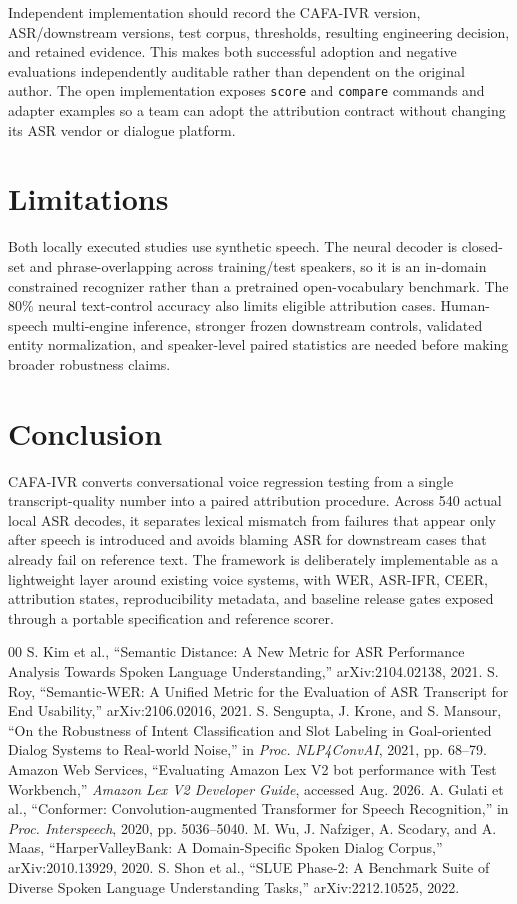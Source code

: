 \documentclass[conference]{IEEEtran}
\begin{document}
Independent implementation should record the CAFA-IVR version, ASR/downstream versions, test corpus, thresholds, resulting engineering decision, and retained evidence. This makes both successful adoption and negative evaluations independently auditable rather than dependent on the original author. The open implementation exposes \texttt{score} and \texttt{compare} commands and adapter examples so a team can adopt the attribution contract without changing its ASR vendor or dialogue platform.

\section{Limitations}
Both locally executed studies use synthetic speech. The neural decoder is closed-set and phrase-overlapping across training/test speakers, so it is an in-domain constrained recognizer rather than a pretrained open-vocabulary benchmark. The 80\% neural text-control accuracy also limits eligible attribution cases. Human-speech multi-engine inference, stronger frozen downstream controls, validated entity normalization, and speaker-level paired statistics are needed before making broader robustness claims.

\section{Conclusion}
CAFA-IVR converts conversational voice regression testing from a single transcript-quality number into a paired attribution procedure. Across 540 actual local ASR decodes, it separates lexical mismatch from failures that appear only after speech is introduced and avoids blaming ASR for downstream cases that already fail on reference text. The framework is deliberately implementable as a lightweight layer around existing voice systems, with WER, ASR-IFR, CEER, attribution states, reproducibility metadata, and baseline release gates exposed through a portable specification and reference scorer.

\begin{thebibliography}{00}
 S. Kim et al., ``Semantic Distance: A New Metric for ASR Performance Analysis Towards Spoken Language Understanding,'' arXiv:2104.02138, 2021.
 S. Roy, ``Semantic-WER: A Unified Metric for the Evaluation of ASR Transcript for End Usability,'' arXiv:2106.02016, 2021.
 S. Sengupta, J. Krone, and S. Mansour, ``On the Robustness of Intent Classification and Slot Labeling in Goal-oriented Dialog Systems to Real-world Noise,'' in \emph{Proc. NLP4ConvAI}, 2021, pp. 68--79.
 Amazon Web Services, ``Evaluating Amazon Lex V2 bot performance with Test Workbench,'' \emph{Amazon Lex V2 Developer Guide}, accessed Aug. 2026.
 A. Gulati et al., ``Conformer: Convolution-augmented Transformer for Speech Recognition,'' in \emph{Proc. Interspeech}, 2020, pp. 5036--5040.
 M. Wu, J. Nafziger, A. Scodary, and A. Maas, ``HarperValleyBank: A Domain-Specific Spoken Dialog Corpus,'' arXiv:2010.13929, 2020.
 S. Shon et al., ``SLUE Phase-2: A Benchmark Suite of Diverse Spoken Language Understanding Tasks,'' arXiv:2212.10525, 2022.
\end{thebibliography}
\end{document}
